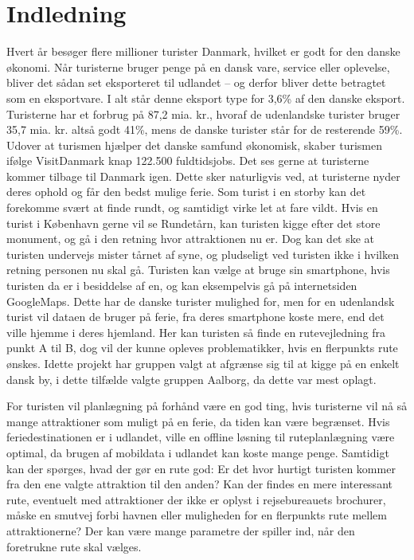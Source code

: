\chapter{Indledning}

Hvert år besøger flere millioner turister Danmark, hvilket er godt for den danske økonomi. Når turisterne bruger penge på en dansk vare, service eller oplevelse, bliver det sådan set eksporteret til udlandet – og derfor bliver dette betragtet som en eksportvare. I alt står denne eksport type for 3,6\% af den danske eksport. Turisterne har et forbrug på 87,2 mia. kr., hvoraf de udenlandske turister bruger 35,7 mia. kr. altså godt 41\%, mens de danske turister står for de resterende 59\%. Udover at turismen hjælper det danske samfund økonomisk, skaber turismen ifølge VisitDanmark knap 122.500 fuldtidsjobs. \citep{faktaogtalVD}  \newline
Det ses gerne at turisterne kommer tilbage til Danmark igen. Dette sker naturligvis ved, at turisterne nyder deres ophold og får den bedst mulige ferie. Som turist i en storby kan det forekomme svært at finde rundt, og samtidigt virke let at fare vildt. Hvis en turist i København gerne vil se Rundetårn, kan turisten kigge efter det store monument, og gå i den retning hvor attraktionen nu er. Dog kan det ske at turisten undervejs mister tårnet af syne, og pludseligt ved turisten ikke i hvilken retning personen nu skal gå. Turisten kan vælge at bruge sin smartphone, hvis turisten da er i besiddelse af en, og kan eksempelvis gå på internetsiden GoogleMaps. Dette har de danske turister mulighed for, men for en udenlandsk turist vil dataen de bruger på ferie, fra deres smartphone koste mere, end det ville hjemme i deres hjemland\citep{VF}.  Her kan turisten så finde en rutevejledning fra punkt A til B, dog vil der kunne opleves problematikker, hvis en flerpunkts rute ønskes. Idette projekt har gruppen valgt at afgrænse sig til at kigge på en enkelt dansk by, i dette tilfælde valgte gruppen Aalborg, da dette var mest oplagt.  \newline

For turisten vil planlægning på forhånd være en god ting, hvis turisterne vil nå så mange attraktioner som muligt på en ferie, da tiden kan være begrænset\citep{YouthCentral}. Hvis feriedestinationen er i udlandet, ville en offline løsning til ruteplanlægning være optimal, da brugen af mobildata i udlandet kan koste mange penge\citep {TDC}.\newline
Samtidigt kan der spørges, hvad der gør en rute god: Er det hvor hurtigt turisten kommer fra den ene valgte attraktion til den anden? Kan der findes en mere interessant rute, eventuelt med attraktioner der ikke er oplyst i rejsebureauets brochurer, måske en smutvej forbi havnen eller muligheden for en flerpunkts rute mellem attraktionerne? Der kan være mange parametre der spiller ind, når den foretrukne rute skal vælges. \newline


